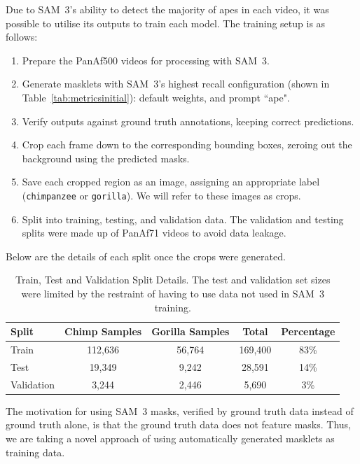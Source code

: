 \documentclass[author={Jacob Stephenson},
    degree={BSc},
    title={Robust Great Ape Species Detection in Wild Camera Trap Imagery with Promptable Concept Segmentation},
    unit={COMS30045},
    subtitle={}]{dissertation}
\begin{document}
Due to SAM~3's ability to detect the majority of apes in each video, it was possible to utilise its outputs to train each model. The training setup is as follows:
\begin{enumerate}
    \item Prepare the PanAf500 videos for processing with SAM~3.
    \item Generate masklets with SAM~3's highest recall configuration (shown in Table~\ref{tab:metricsinitial}): default weights, and prompt ``ape".
    \item Verify outputs against ground truth annotations, keeping correct predictions.
    \item Crop each frame down to the corresponding bounding boxes, zeroing out the background using the predicted masks.
    \item Save each cropped region as an image, assigning an appropriate label (\texttt{chimpanzee} or \texttt{gorilla}). We will refer to these images as crops.
    \item Split into training, testing, and validation data. The validation and testing splits were made up of PanAf71 videos to avoid data leakage.
\end{enumerate}
Below are the details of each split once the crops were generated.

\begin{table}[h]
    \centering

    \begin{tabular}{l|cccc}
        \toprule
        \textbf{Split} & \textbf{Chimp Samples} & \textbf{Gorilla Samples} & \textbf{Total} & \textbf{Percentage} \\
        \midrule
        Train & 112,636 & 56,764 & 169,400 & 83\% \\
        Test & 19,349 & 9,242 & 28,591 & 14\% \\
        Validation & 3,244 & 2,446 & 5,690 & 3\% \\
        \bottomrule
    \end{tabular}

    \caption[Train, Test and Validation Split Details]{Train, Test and Validation Split Details. The test and validation set sizes were limited by the restraint of having to use data not used in SAM~3 training.}
    \label{tab:trainsplit}
\end{table}

The motivation for using SAM~3 masks, verified by ground truth data instead of ground truth alone, is that the ground truth data does not feature masks. Thus, we are taking a novel approach of using automatically generated masklets as training data.
\end{document}
